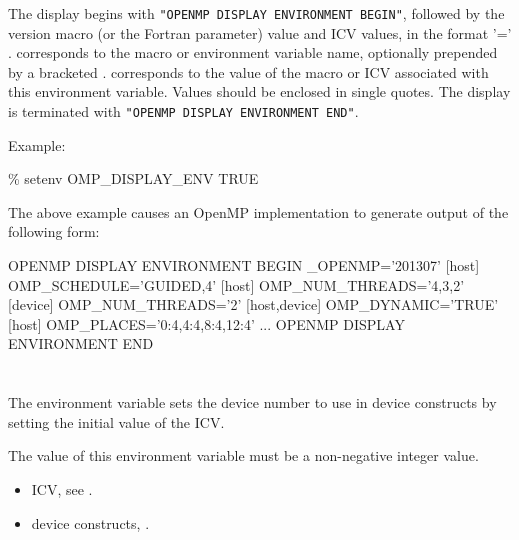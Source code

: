 The display begins with \texttt{"OPENMP DISPLAY ENVIRONMENT BEGIN"}, followed by 
the  version macro (or the  Fortran parameter) value and 
ICV values, in the format  '=' .  corresponds to the macro or 
environment variable name, optionally prepended by a bracketed .  
corresponds to the value of the macro or ICV associated with this environment variable. 
Values should be enclosed in single quotes. The display is terminated with 
\texttt{"OPENMP DISPLAY ENVIRONMENT END"}.

Example: 
\begin{boxedcode}
\% setenv OMP\_DISPLAY\_ENV TRUE
\end{boxedcode}

The above example causes an OpenMP implementation to generate output of the 
following form:

\begin{boxedcode}
OPENMP DISPLAY ENVIRONMENT BEGIN
  \_OPENMP='201307'
  [host] OMP\_SCHEDULE='GUIDED,4'
  [host] OMP\_NUM\_THREADS='4,3,2'
  [device] OMP\_NUM\_THREADS='2'
  [host,device] OMP\_DYNAMIC='TRUE'
  [host] OMP\_PLACES='{0:4},{4:4},{8:4},{12:4}'
  ...
OPENMP DISPLAY ENVIRONMENT END
\end{boxedcode}








\section{}
\label{sec:OMP_DEFAULT_DEVICE}
The  environment variable sets the device number to use in 
device constructs by setting the initial value of the  ICV.

The value of this environment variable must be a non-negative integer value.

\crossreferences
\begin{itemize}
\item {} ICV, see .

\item device constructs, .
\end{itemize}


